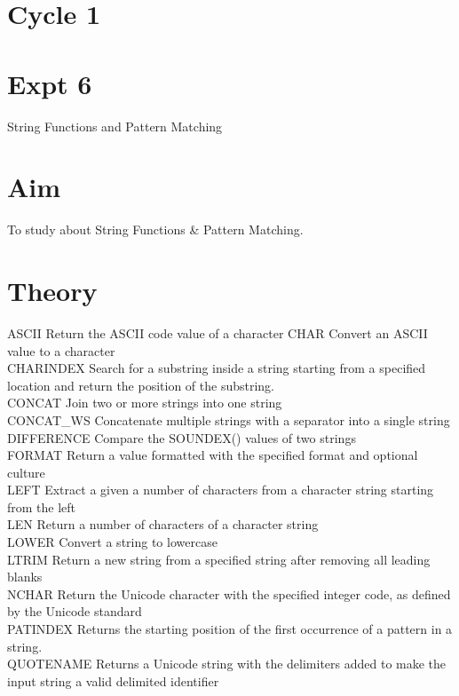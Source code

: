 \documentclass[13pt,oneside]{book}
\begin{document}
					\section*{Cycle 1}
					\section*{Expt 6}
					\begin{center}
						\Large{String Functions and Pattern Matching}
					\end{center}
					
					\section*{Aim}
					\large To study about String Functions \& Pattern Matching.
					\section*{Theory}
					ASCII	Return the ASCII code value of a character
CHAR	Convert an ASCII value to a character\\
CHARINDEX	Search for a substring inside a string starting from a specified location and return the position of the substring.\\
CONCAT	Join two or more strings into one string\\
CONCAT\_WS	Concatenate multiple strings with a separator into a single string\\
DIFFERENCE	Compare the SOUNDEX() values of two strings\\
FORMAT	Return a value formatted with the specified format and optional culture\\
LEFT	Extract a given a number of characters from a character string starting from the left\\
LEN	Return a number of characters of a character string\\
LOWER	Convert a string to lowercase\\
LTRIM	Return a new string from a specified string after removing all leading blanks\\
NCHAR	Return the Unicode character with the specified integer code, as defined by the Unicode standard\\
PATINDEX	Returns the starting position of the first occurrence of a pattern in a string.\\
QUOTENAME	Returns a Unicode string with the delimiters added to make the input string a valid delimited identifier\\
\end{document}
